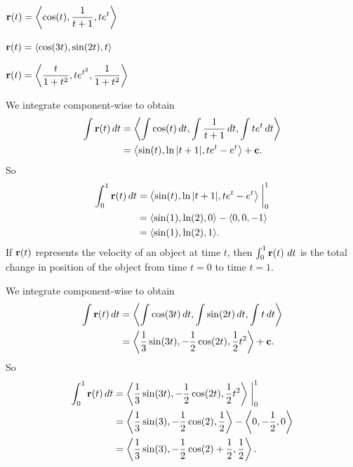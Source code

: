 \begin{exercises}
	\ba
	\item $\displaystyle \mathbf{r}(t) = \left\langle \cos(t), \frac{1}{t+1}, te^t \right\rangle$ 
	
	\item $\displaystyle \mathbf{r}(t) = \left\langle \cos(3t), \sin(2t), t \right\rangle $ 
	
	\item $\displaystyle \mathbf{r}(t) = \left\langle \frac{t}{1+t^2}, te^{t^2}, \frac{1}{1+t^2} \right\rangle$ 

	\ea
\begin{exerciseSolution}
	\ba
	\item We integrate component-wise to obtain
\begin{align*}
\int \mathbf{r}(t) \, dt &= \left\langle \int \cos(t) \, dt, \int \frac{1}{t+1} \, dt, \int te^t \, dt \right\rangle \\
	&= \left\langle \sin(t),  \ln|t+1|, te^t - e^t \right\rangle + \mathbf{c}.
\end{align*} 
So
\begin{align*}
\int_0^1 \mathbf{r}(t) \, dt &= \left\langle \sin(t),  \ln|t+1|, te^t - e^t \right\rangle \biggm|_0^1 \\
	&= \langle \sin(1), \ln(2), 0 \rangle - \langle 0, 0, -1 \rangle \\
	&= \langle \sin(1), \ln(2), 1 \rangle.
\end{align*}
If $\mathbf{r}(t)$ represents the velocity of an object at time $t$, then $\int_0^1 \mathbf{r}(t) \ dt$ is the total change in position of the object from time $t=0$ to time $t=1$. 
	
	\item We integrate component-wise to obtain
\begin{align*}
\int \mathbf{r}(t) \, dt &= \left\langle \int \cos(3t) \, dt, \int \sin(2t) \, dt, \int t \, dt \right\rangle \\
	&= \left\langle \frac{1}{3}\sin(3t), -\frac{1}{2} \cos(2t), \frac{1}{2}t^2 \right\rangle + \mathbf{c}.
\end{align*} 
So
\begin{align*}
\int_0^1 \mathbf{r}(t) \, dt &= \left\langle \frac{1}{3}\sin(3t), -\frac{1}{2} \cos(2t), \frac{1}{2}t^2 \right\rangle \biggm|_0^1 \\
	&= \left\langle \frac{1}{3}\sin(3), -\frac{1}{2} \cos(2), \frac{1}{2} \right\rangle - \left\langle 0, -\frac{1}{2}, 0 \right\rangle \\
	&= \left\langle \frac{1}{3}\sin(3), -\frac{1}{2} \cos(2)+\frac{1}{2}, \frac{1}{2} \right\rangle .
\end{align*}
	

\end{exerciseSolution}
\end{exercises}
